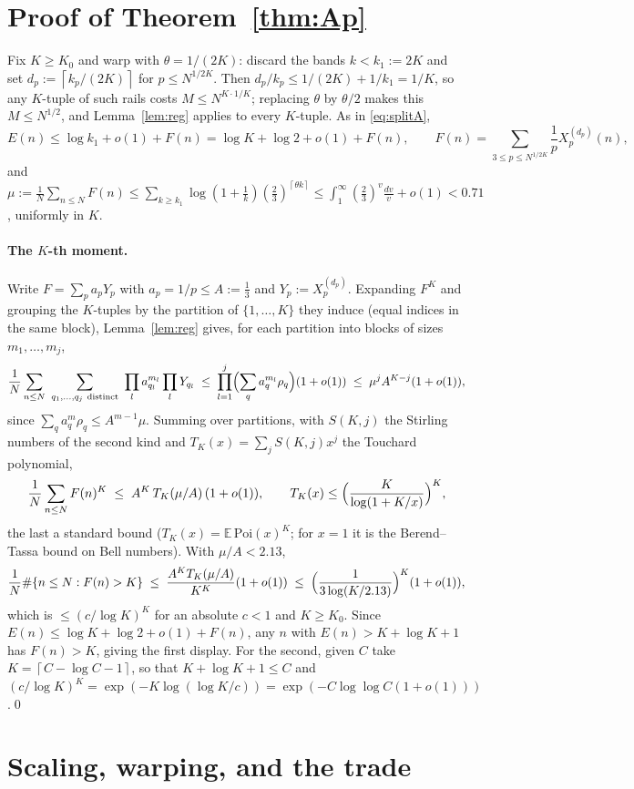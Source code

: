 \documentclass[11pt]{article}
\newcommand{\cl}[1]{\left\lceil #1\right\rceil}
\begin{document}
\section{Proof of Theorem~\ref{thm:Ap}}

Fix $K\ge K_0$ and warp with $\theta=1/(2K)$: discard the bands $k<k_1:=2K$ and set
$d_p:=\cl{k_p/(2K)}$ for $p\le N^{1/2K}$.  Then $d_p/k_p\le 1/(2K)+1/k_1=1/K$, so any
$K$-tuple of such rails costs $M\le N^{K\cdot 1/K}$; replacing $\theta$ by $\theta/2$ makes
this $M\le N^{1/2}$, and Lemma~\ref{lem:reg} applies to every $K$-tuple.  As in
\eqref{eq:splitA},
\[
E(n)\le \log k_1+o(1)+F(n)=\log K+\log 2+o(1)+F(n),\qquad
F(n)=\sum_{3\le p\le N^{1/2K}}\frac1p X_p^{(d_p)}(n),
\]
and $\mu:=\frac1N\sum_{n\le N}F(n)\le\sum_{k\ge k_1}\log(1+\tfrac1k)(\tfrac23)^{\cl{\theta k}}
\le\int_{1}^{\infty}(\tfrac23)^{v}\frac{dv}{v}+o(1)<0.71$, uniformly in $K$.

\paragraph{The $K$-th moment.}
Write $F=\sum_p a_pY_p$ with $a_p=1/p\le A:=\tfrac13$ and $Y_p:=X_p^{(d_p)}$.  Expanding
$F^K$ and grouping the $K$-tuples by the partition of $\{1,\dots,K\}$ they induce (equal
indices in the same block), Lemma~\ref{lem:reg} gives, for each partition into blocks of
sizes $m_1,\dots,m_j$,
\[
\frac1N\sum_{n\le N}\ \sum_{\substack{q_1,\dots,q_j\ \mathrm{distinct}}}\ \prod_{l}a_{q_l}^{m_l}\prod_l Y_{q_l}
\;\le\;\prod_{l=1}^{j}\Bigl(\sum_{q}a_q^{m_l}\rho_q\Bigr)(1+o(1))
\;\le\;\mu^{j}A^{K-j}(1+o(1)),
\]
since $\sum_q a_q^{m}\rho_q\le A^{m-1}\mu$.  Summing over partitions, with $S(K,j)$ the
Stirling numbers of the second kind and $T_K(x)=\sum_j S(K,j)x^j$ the Touchard polynomial,
\[
\frac1N\sum_{n\le N}F(n)^{K}\;\le\;A^{K}\,T_K(\mu/A)\,(1+o(1)),
\qquad
T_K(x)\le\Bigl(\frac{K}{\log(1+K/x)}\Bigr)^{K},
\]
the last a standard bound ($T_K(x)=\mathbb E\,\mathrm{Poi}(x)^K$; for $x=1$ it is the
Berend--Tassa bound on Bell numbers).  With $\mu/A<2.13$,
\[
\frac1N\#\{n\le N: F(n)>K\}\;\le\;\frac{A^{K}T_K(\mu/A)}{K^{K}}(1+o(1))
\;\le\;\Bigl(\frac{1}{3\log(K/2.13)}\Bigr)^{K}(1+o(1)),
\]
which is $\le(c/\log K)^{K}$ for an absolute $c<1$ and $K\ge K_0$.  Since
$E(n)\le\log K+\log2+o(1)+F(n)$, any $n$ with $E(n)>K+\log K+1$ has $F(n)>K$, giving the
first display.  For the second, given $C$ take $K=\cl{C-\log C-1}$, so that
$K+\log K+1\le C$ and
$(c/\log K)^{K}=\exp(-K\log(\log K/c))=\exp(-C\log\log C(1+o(1)))$.\qed

\section{Scaling, warping, and the trade}\label{sec:budget}
\end{document}
